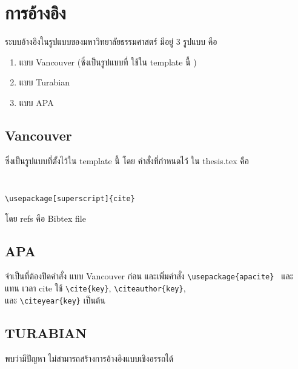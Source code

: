 \chapter{การอ้างอิง}

ระบบอ้างอิงในรูปแบบของมหาวิทยาลัยธรรมศาสตร์ มีอยู่  3 รูปแบบ คือ
\begin{enumerate}[leftmargin=0pt,itemindent=0.6in]
\item แบบ Vancouver (ซึ่งเป็นรูปแบบที่ ใช้ใน template นี้ )
\item แบบ Turabian 
\item แบบ APA
\end{enumerate}

\section{Vancouver}
ซึ่งเป็นรูปแบบที่ตั้งไว้ใน template นี้ โดย คำสั่งที่กำหนดไว้ ใน thesis.tex คือ 
\begin{enumerate}[leftmargin=0pt,itemindent=0.6in]
{\tt
\item  \lstinline|\usepackage[superscript]{cite}| 
 
\item  \lstinline||
\item  \lstinline||} โดย refs คือ Bibtex file 


\end{enumerate}

\section{APA}
จำเป็นที่ต้องปิดคำสั่ง แบบ Vancouver ก่อน และเพิ่มคำสั่ง {\tt \lstinline|\usepackage{apacite}| }
และ {\tt \lstinline||}  แทน เวลา cite ใช้ {\tt \lstinline|\cite{key}|},  {\tt \lstinline|\citeauthor{key}|},
\\ และ {\tt \lstinline|\citeyear{key}|} เป็นต้น

\section{TURABIAN}
พบว่ามีปัญหา ไม่สามารถสร้างการอ้างอิงแบบเชิงอรรถได้ 


